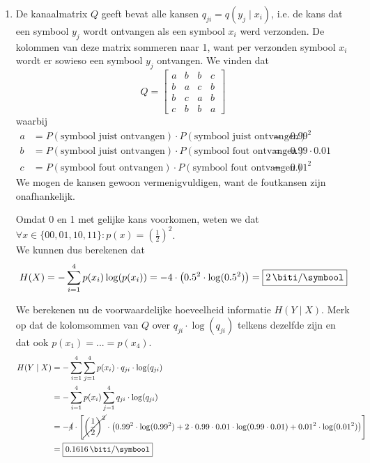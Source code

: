 \documentclass{kuburgiearticle}
\begin{document}
	\begin{enumerate}
		\item De kanaalmatrix \(Q\) geeft bevat alle kansen \(q_{ji}=q(y_j \mid x_i)\), i.e. de kans dat een symbool \(y_j\) wordt ontvangen als een symbool \(x_i\) werd verzonden. De kolommen van deze matrix sommeren naar 1, want per verzonden symbool \(x_i\) wordt er sowieso een symbool \(y_j\) ontvangen. We vinden dat \[
		Q = \begin{bmatrix}
			a & b & b & c \\
			b & a & c & b \\
			b & c & a & b \\
			c & b & b & a
		\end{bmatrix}\] waarbij \begin{align*}
		 a &= P(\text{symbool juist ontvangen}) \cdot P(\text{symbool juist ontvangen}) &=&\, 0.99^2 &&\\
		 b &= P(\text{symbool juist ontvangen}) \cdot P(\text{symbool fout ontvangen}) &=&\, 0.99 \cdot 0.01&&\\
		 c &= P(\text{symbool fout ontvangen}) \cdot P(\text{symbool fout ontvangen}) &=&\, 0.01^2&&
		\end{align*}
		We mogen de kansen gewoon vermenigvuldigen, want de foutkansen zijn onafhankelijk.

		Omdat 0 en 1 met gelijke kans voorkomen, weten we dat \(\forall x \in \{00,01,10,11\} : p(x)=\left(\frac{1}{2}\right)^2\). \\We kunnen dus berekenen dat \[
		H(X)=-\sum_{i=1}^4 p(x_i) \log(p(x_i))=-4 \cdot \left( 0.5^2 \cdot \log(0.5^2) \right) = \boxed{\SI{2}{\biti \per \symbool}} \]

		We berekenen nu de voorwaardelijke hoeveelheid informatie \(H(Y \mid X)\). Merk op dat de kolomsommen van \(Q\) over \(q_{ji} \cdot \log(q_{ji})\) telkens dezelfde zijn en dat ook \(p(x_1)=...=p(x_4)\).
		\begin{align*}
			H(Y \mid X) &= - \sum_{i=1}^{4} \sum_{j=1}^{4} p(x_i) \cdot q_{ji} \cdot \log(q_{ji})\\
					&= - \sum_{i=1}^{4} p(x_i) \sum_{j=1}^{4} q_{ji} \cdot \log(q_{ji})\\
					&= - \cancel{4} \cdot \left[ \cancel{\left(\frac{1}{2}\right)^2} \cdot \left(0.99^2 \cdot \log(0.99^2) + 2 \cdot 0.99 \cdot 0.01 \cdot \log(0.99 \cdot 0.01) + 0.01^2 \cdot \log (0.01^2)\right) \right] \\
					&= \boxed{\SI{0.1616}{\biti \per \symbool}}
		\end{align*}


\end{enumerate}
\end{document}
